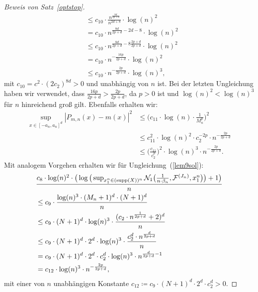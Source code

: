 \begin{proof}[Beweis von Satz~\ref{optstop}]
\begin{equation}
\begin{split}
& \leq c_{10} \cdot \frac{n^{\frac{8d}{2p + d}}}{n^{2d + 8}} \cdot \log(n)^2 \\
& = c_{10} \cdot n^{\frac{8d}{2p + d} - 2d -8} \cdot \log(n)^2 \\
& \leq c_{10} \cdot n^{\frac{8d}{2p + d}  -8\frac{2p + d}{2p + d}} \cdot \log(n)^2 \\
& = c_{10} \cdot n^{-\frac{16p}{2p + d}} \cdot \log(n)^2 \\
& \leq c_{10} \cdot n^{-\frac{2p}{2p + d}} \cdot \log(n)^3,
\end{split}
\end{equation}
mit $c_{10} = c^2 \cdot (2c_2)^{8d} > 0$ und unabhängig von $n$ ist. Bei der letzten Ungleichung haben wir verwendet, dass $\frac{16p}{2p + d} > \frac{2p}{2p + d}$, da $p > 0$ ist und $\log(n)^2 < \log(n)^3$ für $n$ hinreichend groß gilt. Ebenfalls erhalten wir:
\begin{equation}
\label{4thsum}
\begin{split}
\sup_{x \in [-a_n, a_n]^d} |P_{m,n}(x) - m(x)|^2 & \leq \bigg(c_{11} \cdot \log(n) \cdot \frac{1}{M_n^p}\bigg)^2 \\
& \leq c_{11}^2 \cdot \log(n)^2 \cdot c_{2}^{-2p} \cdot n^{-\frac{2p}{2p + d}} \\
& \leq \bigg(\frac{c_{11}}{c_2^p}\bigg)^2 \cdot \log(n)^3 \cdot n^{-\frac{2p}{2p + d}}.
\end{split}
\end{equation}
Mit analogem Vorgehen erhalten wir für Ungleichung~(\ref{lem9sol}):
\begin{equation}
\begin{split}
& \frac{c_8 \cdot \log(n)^2 \cdot \big(\log\big(\sup_{x_1^n \in (\operatorname{supp}(X))^n}\mathcal{N}_1\big(\frac{1}{n \cdot \beta_n},\mathcal{F}^{(J_n)},x_1^n\big)\big) + 1\big)}{n} \\
& \leq c_9 \cdot \frac{\log(n)^3 \cdot (M_n + 1)^d \cdot (N + 1)^d}{n} \\
& \leq c_9 \cdot (N+1)^d \cdot \log(n)^3 \cdot \frac{(c_2 \cdot n^{\frac{1}{2p + d}} + 2)^d}{n} \\
& \leq c_9 \cdot (N+1)^d \cdot 2^d \cdot \log(n)^3 \cdot \frac{c_2^d\cdot n^{\frac{d}{2p + d}}}{n} \\
& = c_9 \cdot (N+1)^d \cdot 2^d \cdot c_2^d \cdot \log(n)^3 \cdot n^{\frac{d}{2p + d} - 1} \\
& = c_{12} \cdot \log(n)^3 \cdot n^{-\frac{2p}{2p + d}},
\end{split}
\end{equation}
mit einer von $n$ unabhängigen Konstante $c_{12} \coloneqq c_9 \cdot (N + 1)^d \cdot 2^d \cdot c_2^d > 0.$

\end{proof}
